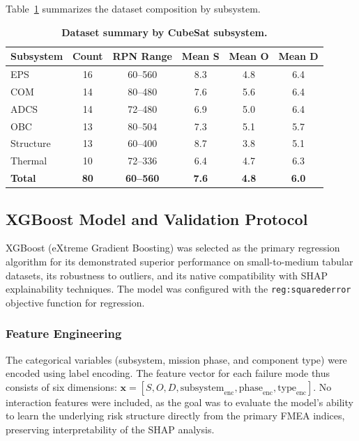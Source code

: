 Table~\ref{tab:dataset_summary} summarizes the dataset composition by subsystem.

\begin{table}[h]
\caption{\textbf{Dataset summary by CubeSat subsystem.}}
\label{tab:dataset_summary}
\centering
\begin{tabular}{lccccc}
\hline
\textbf{Subsystem} & \textbf{Count} & \textbf{RPN Range} & \textbf{Mean S} & \textbf{Mean O} & \textbf{Mean D} \\
\hline
EPS        & 16 & 60--560  & 8.3 & 4.8 & 6.4 \\
COM        & 14 & 80--480  & 7.6 & 5.6 & 6.4 \\
ADCS       & 14 & 72--480  & 6.9 & 5.0 & 6.4 \\
OBC        & 13 & 80--504  & 7.3 & 5.1 & 5.7 \\
Structure  & 13 & 60--400  & 8.7 & 3.8 & 5.1 \\
Thermal    & 10 & 72--336  & 6.4 & 4.7 & 6.3 \\
\hline
\textbf{Total} & \textbf{80} & \textbf{60--560} & \textbf{7.6} & \textbf{4.8} & \textbf{6.0} \\
\hline
\end{tabular}
\end{table}

\subsection{XGBoost Model and Validation Protocol}
\label{subsec:xgboost}

XGBoost (eXtreme Gradient Boosting) was selected as the primary regression algorithm for its demonstrated superior performance on small-to-medium tabular datasets, its robustness to outliers, and its native compatibility with SHAP explainability techniques. The model was configured with the \texttt{reg:squarederror} objective function for regression.

\subsubsection{Feature Engineering}
The categorical variables (subsystem, mission phase, and component type) were encoded using label encoding. The feature vector for each failure mode thus consists of six dimensions: $\mathbf{x} = [S, O, D, \text{subsystem}_\text{enc}, \text{phase}_\text{enc}, \text{type}_\text{enc}]$. No interaction features were included, as the goal was to evaluate the model's ability to learn the underlying risk structure directly from the primary FMEA indices, preserving interpretability of the SHAP analysis.

